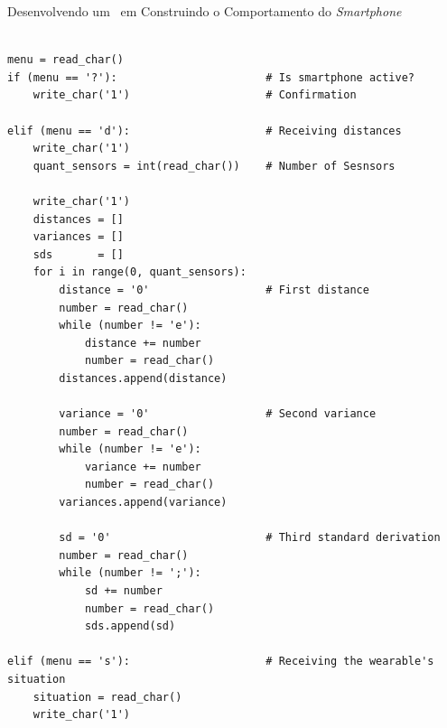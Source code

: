 \begin{frame}{Desenvolvendo um \Wearable\ em \Software }{Construindo o Comportamento do \textit{Smartphone} }
    \vspace{-1.1em}
    \begin{center}
    \begin{minipage}{9cm}
    \begin{verbatim}

menu = read_char()
if (menu == '?'):                       # Is smartphone active?
    write_char('1')                     # Confirmation

elif (menu == 'd'):                     # Receiving distances
    write_char('1')
    quant_sensors = int(read_char())    # Number of Sesnsors

    write_char('1')
    distances = []
    variances = []
    sds       = []
    for i in range(0, quant_sensors):
        distance = '0'                  # First distance
        number = read_char()
        while (number != 'e'):
            distance += number
            number = read_char()
        distances.append(distance)

        variance = '0'                  # Second variance
        number = read_char()
        while (number != 'e'):
            variance += number
            number = read_char()
        variances.append(variance)

        sd = '0'                        # Third standard derivation
        number = read_char()
        while (number != ';'):
            sd += number
            number = read_char()
            sds.append(sd)

elif (menu == 's'):                     # Receiving the wearable's situation
    situation = read_char()
    write_char('1')
    \end{verbatim}
\end{minipage}
\end{center}
\end{frame}



